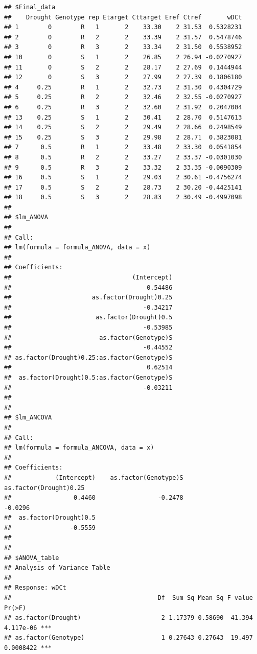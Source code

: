 \documentclass[
]{article}
\begin{document}
\begin{verbatim}
## $Final_data
##    Drought Genotype rep Etarget Cttarget Eref Ctref       wDCt
## 1        0        R   1       2    33.30    2 31.53  0.5328231
## 2        0        R   2       2    33.39    2 31.57  0.5478746
## 3        0        R   3       2    33.34    2 31.50  0.5538952
## 10       0        S   1       2    26.85    2 26.94 -0.0270927
## 11       0        S   2       2    28.17    2 27.69  0.1444944
## 12       0        S   3       2    27.99    2 27.39  0.1806180
## 4     0.25        R   1       2    32.73    2 31.30  0.4304729
## 5     0.25        R   2       2    32.46    2 32.55 -0.0270927
## 6     0.25        R   3       2    32.60    2 31.92  0.2047004
## 13    0.25        S   1       2    30.41    2 28.70  0.5147613
## 14    0.25        S   2       2    29.49    2 28.66  0.2498549
## 15    0.25        S   3       2    29.98    2 28.71  0.3823081
## 7      0.5        R   1       2    33.48    2 33.30  0.0541854
## 8      0.5        R   2       2    33.27    2 33.37 -0.0301030
## 9      0.5        R   3       2    33.32    2 33.35 -0.0090309
## 16     0.5        S   1       2    29.03    2 30.61 -0.4756274
## 17     0.5        S   2       2    28.73    2 30.20 -0.4425141
## 18     0.5        S   3       2    28.83    2 30.49 -0.4997098
## 
## $lm_ANOVA
## 
## Call:
## lm(formula = formula_ANOVA, data = x)
## 
## Coefficients:
##                                 (Intercept)  
##                                     0.54486  
##                      as.factor(Drought)0.25  
##                                    -0.34217  
##                       as.factor(Drought)0.5  
##                                    -0.53985  
##                        as.factor(Genotype)S  
##                                    -0.44552  
## as.factor(Drought)0.25:as.factor(Genotype)S  
##                                     0.62514  
##  as.factor(Drought)0.5:as.factor(Genotype)S  
##                                    -0.03211  
## 
## 
## $lm_ANCOVA
## 
## Call:
## lm(formula = formula_ANCOVA, data = x)
## 
## Coefficients:
##            (Intercept)    as.factor(Genotype)S  as.factor(Drought)0.25  
##                 0.4460                 -0.2478                 -0.0296  
##  as.factor(Drought)0.5  
##                -0.5559  
## 
## 
## $ANOVA_table
## Analysis of Variance Table
## 
## Response: wDCt
##                                        Df  Sum Sq Mean Sq F value    Pr(>F)    
## as.factor(Drought)                      2 1.17379 0.58690  41.394 4.117e-06 ***
## as.factor(Genotype)                     1 0.27643 0.27643  19.497 0.0008422 ***

\end{verbatim}
\end{document}
